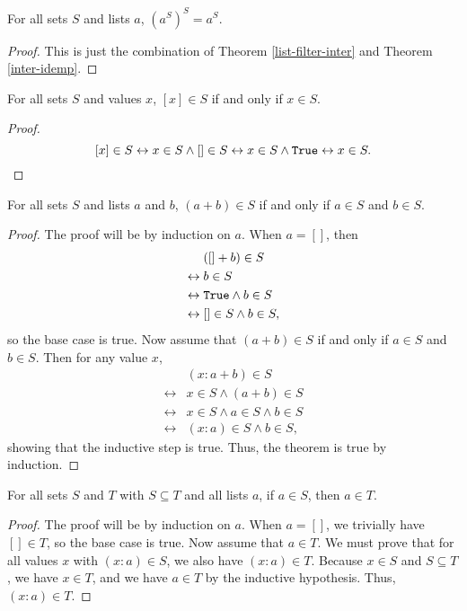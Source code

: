 \documentclass[../math.tex]{subfiles}
\begin{document}
\begin{theorem} \label{list-filter-filter}
    For all sets $S$ and lists $a$, $(a^S)^S = a^S$.
\end{theorem}
\begin{proof}
    This is just the combination of Theorem \ref{list-filter-inter} and Theorem
    \ref{inter-idemp}.
\end{proof}

\begin{theorem}
    For all sets $S$ and values $x$, $[x] \in S$ if and only if $x \in S$.
\end{theorem}
\begin{proof}
    \[
        [x] \in S \leftrightarrow x \in S \wedge [] \in S
        \leftrightarrow x \in S \wedge \vtt{True}
        \leftrightarrow x \in S.
    \]
\end{proof}

\begin{theorem} \label{list-prop-conc}
    For all sets $S$ and lists $a$ and $b$, $(a + b) \in S$ if and only if $a
    \in S$ and $b \in S$.
\end{theorem}
\begin{proof}
    The proof will be by induction on $a$.  When $a = []$, then
    \begin{align*}
        &([] + b) \in S \\
        \leftrightarrow{}&b \in S \\
        \leftrightarrow{}&\vtt{True} \wedge b \in S \\
        \leftrightarrow{}&[] \in S \wedge b \in S,
    \end{align*}
    so the base case is true.  Now assume that $(a + b) \in S$ if and only if $a
    \in S$ and $b \in S$.  Then for any value $x$,
    \begin{align*}
        &(x : a + b) \in S \\
        \leftrightarrow{}&x \in S \wedge (a + b) \in S \\
        \leftrightarrow{}&x \in S \wedge a \in S \wedge b \in S \\
        \leftrightarrow{}&(x : a) \in S \wedge b \in S,
    \end{align*}
    showing that the inductive step is true.  Thus, the theorem is true by
    induction.
\end{proof}

\begin{theorem} \label{list-prop-sub}
    For all sets $S$ and $T$ with $S \subseteq T$ and all lists $a$, if $a \in
    S$, then $a \in T$.
\end{theorem}
\begin{proof}
    The proof will be by induction on $a$.  When $a = []$, we trivially have $[]
    \in T$, so the base case is true.  Now assume that $a \in T$.  We must prove
    that for all values $x$ with $(x : a) \in S$, we also have $(x : a) \in T$.
    Because $x \in S$ and $S \subseteq T$, we have $x \in T$, and we have $a \in
    T$ by the inductive hypothesis.  Thus, $(x : a) \in T$.
\end{proof}
\end{document}

